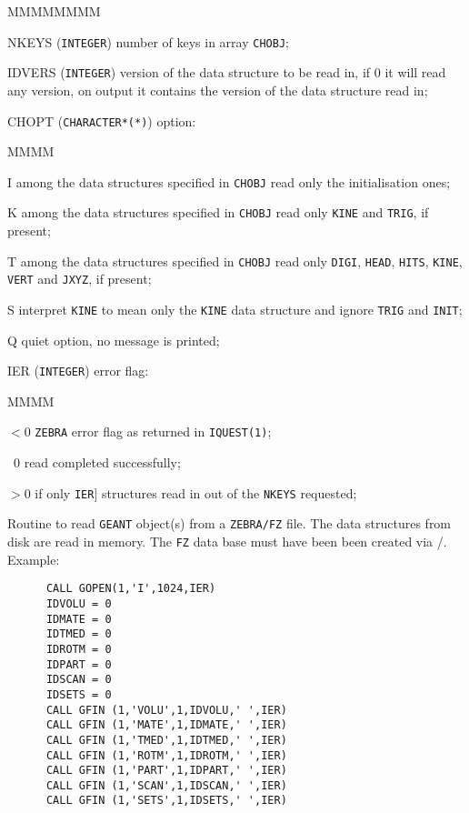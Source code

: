 \begin{DLtt}{MMMMMMMM}
\item[NKEYS] ({\tt INTEGER})  number of keys in array {\tt CHOBJ};
\item[IDVERS] ({\tt INTEGER}) version of the data structure to be read in,
if 0 it will read any version, on output it contains the version of the
data structure read in;
\item[CHOPT] ({\tt CHARACTER*(*)})  option:
\begin{DLtt}{MMMM}
\item[I] among the data structures specified
in {\tt CHOBJ} read only the initialisation ones;
\item[K] among the data structures specified
in {\tt CHOBJ} read only {\tt KINE} and {\tt TRIG}, if present;
\item[T] among the data structures specified
in {\tt CHOBJ} read only {\tt DIGI}, {\tt HEAD}, {\tt HITS}, {\tt KINE},
{\tt VERT} and {\tt JXYZ}, if present; 
\item[S] interpret {\tt KINE} to mean only the {\tt KINE} data structure
and ignore {\tt TRIG} and {\tt INIT};
\item[Q] quiet option, no message is printed;
\end{DLtt}
\item[IER] ({\tt INTEGER}) error flag:
\begin{DLtt}{MMMM}
\item[$<$0] {\tt ZEBRA} error flag as returned in {\tt IQUEST(1)};
\item[~0] read completed successfully;
\item[$>$0] if only {\tt IER}] structures read in out of the {\tt NKEYS}
requested;
\end{DLtt}
\end{DLtt}

Routine to read {\tt GEANT} object(s) from a {\tt ZEBRA/FZ} file.
The data structures from disk are read in memory.
The {\tt FZ} data base must have been been created via 
/.  Example:
\begin{verbatim}
      CALL GOPEN(1,'I',1024,IER)
      IDVOLU = 0
      IDMATE = 0
      IDTMED = 0
      IDROTM = 0
      IDPART = 0
      IDSCAN = 0
      IDSETS = 0
      CALL GFIN (1,'VOLU',1,IDVOLU,' ',IER)
      CALL GFIN (1,'MATE',1,IDMATE,' ',IER)
      CALL GFIN (1,'TMED',1,IDTMED,' ',IER)
      CALL GFIN (1,'ROTM',1,IDROTM,' ',IER)
      CALL GFIN (1,'PART',1,IDPART,' ',IER)
      CALL GFIN (1,'SCAN',1,IDSCAN,' ',IER)
      CALL GFIN (1,'SETS',1,IDSETS,' ',IER)
\end{verbatim}


